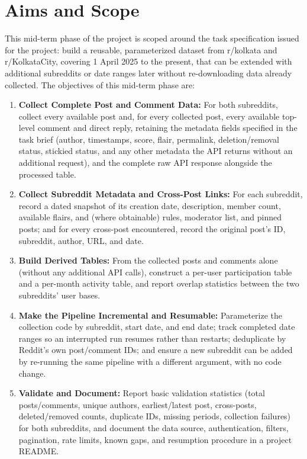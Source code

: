 \documentclass[12pt]{article}
\begin{document}
\section{Aims and Scope}

This mid-term phase of the project is scoped around the task specification issued for the
project: build a reusable, parameterized dataset from r/kolkata and r/KolkataCity, covering 1
April 2025 to the present, that can be extended with additional subreddits or date ranges later
without re-downloading data already collected. The objectives of this mid-term phase are:

\begin{enumerate}
    \item \textbf{Collect Complete Post and Comment Data:} For both subreddits, collect every
    available post and, for every collected post, every available top-level comment and direct
    reply, retaining the metadata fields specified in the task brief (author, timestamps, score,
    flair, permalink, deletion/removal status, stickied status, and any other metadata the API
    returns without an additional request), and the complete raw API response alongside the
    processed table.

    \item \textbf{Collect Subreddit Metadata and Cross-Post Links:} For each subreddit, record a
    dated snapshot of its creation date, description, member count, available flairs, and (where
    obtainable) rules, moderator list, and pinned posts; and for every cross-post encountered,
    record the original post's ID, subreddit, author, URL, and date.

    \item \textbf{Build Derived Tables:} From the collected posts and comments alone (without any
    additional API calls), construct a per-user participation table and a per-month activity
    table, and report overlap statistics between the two subreddits' user bases.

    \item \textbf{Make the Pipeline Incremental and Resumable:} Parameterize the collection code
    by subreddit, start date, and end date; track completed date ranges so an interrupted run
    resumes rather than restarts; deduplicate by Reddit's own post/comment IDs; and ensure a new
    subreddit can be added by re-running the same pipeline with a different argument, with no
    code change.

    \item \textbf{Validate and Document:} Report basic validation statistics (total posts/comments,
    unique authors, earliest/latest post, cross-posts, deleted/removed counts, duplicate IDs,
    missing periods, collection failures) for both subreddits, and document the data source,
    authentication, filters, pagination, rate limits, known gaps, and resumption procedure in a
    project README.
\end{enumerate}
\end{document}
